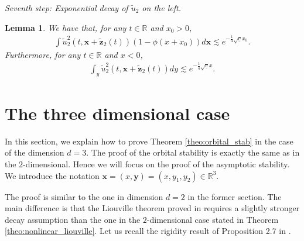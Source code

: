 \documentclass[reqno,10pt]{amsart}
\newtheorem{lemm}{Lemma}[section]
\numberwithin{equation}{section}
\newcommand{\bx}{\mathbf{x}}
\newcommand{\by}{\mathbf{y}}
\newcommand{\bz}{\mathbf{z}}
\begin{document}
\vspace{0.5cm}
\noindent \textit{Seventh step: Exponential decay of $\tilde{u}_2$ on the left.}

\begin{lemm}
	We have that, for any $t\in \mathbb{R}$ and $x_0>0$,
	\begin{align*}
		\int \tilde{u}_2^2\left(t,\bx + \tilde{\bz}_2(t) \right) \left( 1- \phi (x+x_0) \right) d\bx \lesssim e^{-\frac14 \sqrt{\underline{c}}x_0}.
	\end{align*}
	Furthermore, for any $t\in \mathbb{R}$ and $x<0$,
	\begin{align*}
		\int_y \tilde{u}_2^2\left(t,\bx+ \tilde{\bz}_2(t) \right) dy \lesssim e^{- \frac14 \sqrt{\underline{c}}x}.
	\end{align*}
\end{lemm}


\section{The three dimensional case} \label{Sec:3d_case}

In this section, we explain how to prove Theorem \ref{theo:orbital_stab} in the case of the dimension $d=3$. The proof of the orbital stability is exactly the same as in the $2$-dimensional. Hence we will focus on the proof of the asymptotic stability. We introduce the notation $\bx=(x,\by)=(x,y_1,y_2) \in \mathbb R^3$. 

The proof is similar to the one in dimension $d=2$ in the former section.  The main difference is that the Liouville theorem proved in \cite{FHRY23} requires a slightly stronger decay assumption than the one in the $2$-dimensional case stated in  Theorem \ref{theo:nonlinear_liouville}. Let us recall the rigidity result of Proposition 2.7 in \cite{FHRY23}.
\end{document}
